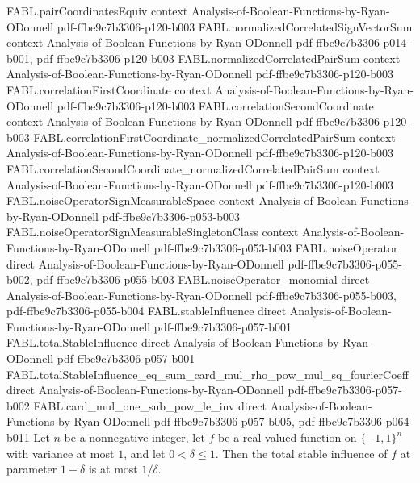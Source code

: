 \begin{theorem}
\proofstep
  {FABL.pairCoordinatesEquiv}
  {context}
  {Analysis-of-Boolean-Functions-by-Ryan-ODonnell}
  {pdf-ffbe9c7b3306-p120-b003}
\proofstep
  {FABL.normalizedCorrelatedSignVectorSum}
  {context}
  {Analysis-of-Boolean-Functions-by-Ryan-ODonnell}
  {pdf-ffbe9c7b3306-p014-b001,
    pdf-ffbe9c7b3306-p120-b003}
\proofstep
  {FABL.normalizedCorrelatedPairSum}
  {context}
  {Analysis-of-Boolean-Functions-by-Ryan-ODonnell}
  {pdf-ffbe9c7b3306-p120-b003}
\proofstep
  {FABL.correlationFirstCoordinate}
  {context}
  {Analysis-of-Boolean-Functions-by-Ryan-ODonnell}
  {pdf-ffbe9c7b3306-p120-b003}
\proofstep
  {FABL.correlationSecondCoordinate}
  {context}
  {Analysis-of-Boolean-Functions-by-Ryan-ODonnell}
  {pdf-ffbe9c7b3306-p120-b003}
\proofstep
  {FABL.correlationFirstCoordinate_normalizedCorrelatedPairSum}
  {context}
  {Analysis-of-Boolean-Functions-by-Ryan-ODonnell}
  {pdf-ffbe9c7b3306-p120-b003}
\proofstep
  {FABL.correlationSecondCoordinate_normalizedCorrelatedPairSum}
  {context}
  {Analysis-of-Boolean-Functions-by-Ryan-ODonnell}
  {pdf-ffbe9c7b3306-p120-b003}
\proofstep
  {FABL.noiseOperatorSignMeasurableSpace}
  {context}
  {Analysis-of-Boolean-Functions-by-Ryan-ODonnell}
  {pdf-ffbe9c7b3306-p053-b003}
\proofstep
  {FABL.noiseOperatorSignMeasurableSingletonClass}
  {context}
  {Analysis-of-Boolean-Functions-by-Ryan-ODonnell}
  {pdf-ffbe9c7b3306-p053-b003}
\proofstep
  {FABL.noiseOperator}
  {direct}
  {Analysis-of-Boolean-Functions-by-Ryan-ODonnell}
  {pdf-ffbe9c7b3306-p055-b002,
    pdf-ffbe9c7b3306-p055-b003}
\proofstep
  {FABL.noiseOperator_monomial}
  {direct}
  {Analysis-of-Boolean-Functions-by-Ryan-ODonnell}
  {pdf-ffbe9c7b3306-p055-b003,
    pdf-ffbe9c7b3306-p055-b004}
\proofstep
  {FABL.stableInfluence}
  {direct}
  {Analysis-of-Boolean-Functions-by-Ryan-ODonnell}
  {pdf-ffbe9c7b3306-p057-b001}
\proofstep
  {FABL.totalStableInfluence}
  {direct}
  {Analysis-of-Boolean-Functions-by-Ryan-ODonnell}
  {pdf-ffbe9c7b3306-p057-b001}
\proofstep
  {FABL.totalStableInfluence_eq_sum_card_mul_rho_pow_mul_sq_fourierCoeff}
  {direct}
  {Analysis-of-Boolean-Functions-by-Ryan-ODonnell}
  {pdf-ffbe9c7b3306-p057-b002}
\proofstep
  {FABL.card_mul_one_sub_pow_le_inv}
  {direct}
  {Analysis-of-Boolean-Functions-by-Ryan-ODonnell}
  {pdf-ffbe9c7b3306-p057-b005,
    pdf-ffbe9c7b3306-p064-b011}
Let $n$ be a nonnegative integer, let $f$ be a real-valued function on $\{-1,1\}^n$
with variance at most $1$, and let $0<\delta\le 1$. Then the total stable influence of
$f$ at parameter $1-\delta$ is at most $1/\delta$.
\end{theorem}

